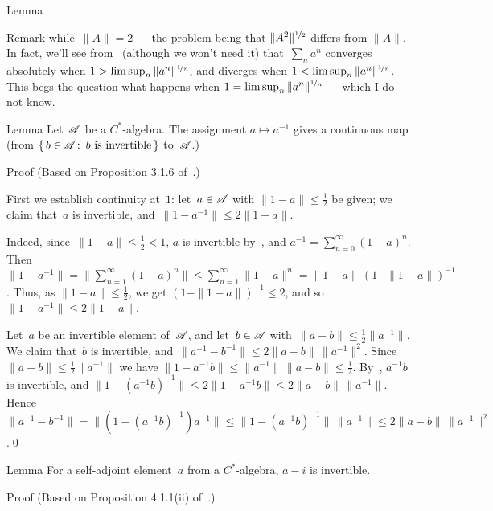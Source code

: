 \documentclass[a]{subfiles}
\begin{document}
\begin{parsec}
\begin{point}{Lemma}
\begin{point}{Remark}
while~$\|A\|=2$ --- the problem being that
$\|A^2\|^{\nicefrac{1}{2}}$ differs from $\|A\|$.
In fact,
we'll see from~
(although we won't need it)
that~$\sum_n a^n$
converges absolutely when $1>\limsup_n \|a^n\|^{\nicefrac{1}{n}}$,
and diverges when $1<\limsup_n \|a^n\|^{\nicefrac{1}{n}}$.
This begs the question
what happens when $1=\limsup_n \|a^n\|^{\nicefrac{1}{n}}$
--- which I do not know.
\end{point}
\end{point}
\begin{point}{Lemma}%
Let~$\mathscr{A}$ be a $C^*$-algebra.
The assignment $a\mapsto a^{-1}$
gives a  continuous map
(from $\{\,b\in \mathscr{A}\colon\, \text{$b$ is invertible}\,\}$
to~$\mathscr{A}$.)
\begin{point}{Proof}
(Based on Proposition 3.1.6 of~\cite{kr}.)

First we establish continuity at~$1$:
let~$a\in\mathscr{A}$ with $\|1-a\|\leq \frac{1}{2}$ be given;
we claim that~$a$ is invertible,
and~$\|1-a^{-1}\| \leq 2\|1-a\|$.

Indeed, since~$\|1-a\|\leq \frac{1}{2}<1$,
$a$ is invertible by~,
and $a^{-1}=\sum_{n=0}^\infty (1-a)^n$.
Then~$\|1-a^{-1}\|=\|\sum_{n=1}^\infty (1-a)^n\|\leq \sum_{n=1}^\infty \|1-a\|^n
= \|1-a\|\, (1-\|1-a\|)^{-1}$.
Thus, as $\|1-a\|\leq\frac{1}{2}$,
we get $(1-\|1-a\|)^{-1}\leq 2$,
and so $\|1-a^{-1}\|\leq 2\|1-a\|$.
\begin{point}%
Let~$a$ be an invertible element of~$\mathscr{A}$,
and let~$b\in\mathscr{A}$ with~$\|a-b\|\leq\frac{1}{2}\|a^{-1}\|$.
We claim that~$b$ is invertible,
and~$\|a^{-1}-b^{-1}\|\leq 2\|a-b\|\,\|a^{-1}\|^2$.
Since $\|a-b\|\leq \frac{1}{2}\|a^{-1}\|$
we have
$\|1-a^{-1}b\|\leq \|a^{-1}\|\,\|a-b\|\leq \frac{1}{2}$.
By~, $a^{-1}b$ is invertible,
and $\|1-(a^{-1}b)^{-1}\|\leq 2\|1-a^{-1}b\|\leq 2\|a-b\|\,\|a^{-1}\|$.
Hence $\|a^{-1}-b^{-1}\| = \|(1-(a^{-1}b)^{-1})a^{-1}\|
\leq \|1-(a^{-1}b)^{-1}\|\,\|a^{-1}\|\leq 2 \|a-b\|\,\|a^{-1}\|^2$.\qed
\end{point}
\end{point}
\end{point}
%
%
\begin{point}{Lemma}%
For a self-adjoint element~$a$ from a $C^*$-algebra,
$a-i$ is invertible.
\begin{point}{Proof}%
(Based on Proposition 4.1.1(ii) of~\cite{kr}.)


\end{point}
\end{point}
\end{parsec}
\end{document}
